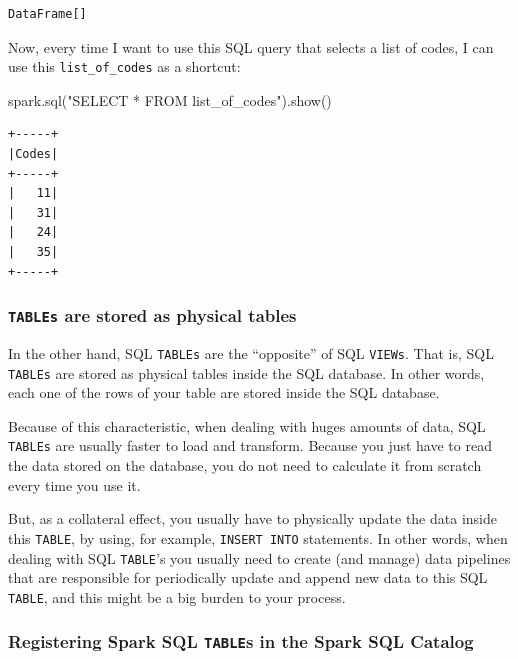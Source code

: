 \documentclass[
  11pt,
  letterpaper,
  DIV=11,
  numbers=noendperiod]{scrreprt}
\newenvironment{Shaded}{\begin{snugshade}}{\end{snugshade}}
\newcommand{\NormalTok}[1]{\textcolor[rgb]{0.00,0.23,0.31}{#1}}
\newcommand{\StringTok}[1]{\textcolor[rgb]{0.13,0.47,0.30}{#1}}
\begin{document}
\begin{verbatim}
DataFrame[]
\end{verbatim}

Now, every time I want to use this SQL query that selects a list of
codes, I can use this \texttt{list\_of\_codes} as a shortcut:

\begin{Shaded}
\begin{Highlighting}[]
\NormalTok{spark.sql(}\StringTok{"SELECT * FROM list\_of\_codes"}\NormalTok{).show()}
\end{Highlighting}
\end{Shaded}

\begin{verbatim}
+-----+
|Codes|
+-----+
|   11|
|   31|
|   24|
|   35|
+-----+
\end{verbatim}

\hypertarget{tables-are-stored-as-physical-tables}{%
\subsubsection{\texorpdfstring{\texttt{TABLEs} are stored as physical
tables}{TABLEs are stored as physical tables}}\label{tables-are-stored-as-physical-tables}}

In the other hand, SQL \texttt{TABLEs} are the ``opposite'' of SQL
\texttt{VIEWs}. That is, SQL \texttt{TABLEs} are stored as physical
tables inside the SQL database. In other words, each one of the rows of
your table are stored inside the SQL database.

Because of this characteristic, when dealing with huges amounts of data,
SQL \texttt{TABLEs} are usually faster to load and transform. Because
you just have to read the data stored on the database, you do not need
to calculate it from scratch every time you use it.

But, as a collateral effect, you usually have to physically update the
data inside this \texttt{TABLE}, by using, for example,
\texttt{INSERT\ INTO} statements. In other words, when dealing with SQL
\texttt{TABLE}'s you usually need to create (and manage) data pipelines
that are responsible for periodically update and append new data to this
SQL \texttt{TABLE}, and this might be a big burden to your process.

\hypertarget{registering-spark-sql-tables-in-the-spark-sql-catalog}{%
\subsubsection{\texorpdfstring{Registering Spark SQL \texttt{TABLE}s in
the Spark SQL
Catalog}{Registering Spark SQL TABLEs in the Spark SQL Catalog}}\label{registering-spark-sql-tables-in-the-spark-sql-catalog}}
\end{document}
